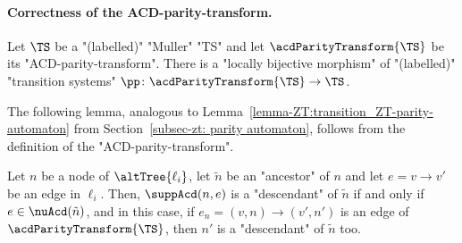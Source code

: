 \documentclass[10pt,a4paper]{amsart}
\newcommand{\re}[1]{\xrightarrow{#1}}
\begin{document}
\paragraph*{Correctness of the ACD-parity-transform.}

\begin{proposition}\label{prop-ACD:correctness_ACD-parity_transform}
	Let $\TS$ be a "(labelled)" "Muller" "TS" and let $\acdParityTransform{\TS}$ be its "ACD-parity-transform". There is a "locally bijective morphism" of "(labelled)" "transition systems" $\pp\colon \acdParityTransform{\TS} \to \TS$.
\end{proposition}

The following lemma, analogous to Lemma~\ref{lemma-ZT:transition_ZT-parity-automaton} from Section~\ref{subsec-zt: parity automaton}, follows from the definition of the "ACD-parity-transform".
\begin{lemma}\label{lemma-acd:transition_ACD-parity_transform}
	Let $n$ be a node of $\altTree{\ell_i}$, let $\tilde{n}$ be an "ancestor" of $n$ and let $e= v\re{}v'$ be an edge in $\ell_i$. Then, $\suppAcd(n, e)$ is a "descendant" of $\tilde{n}$ if and only if $e\in \nuAcd(\tilde{n})$, and in this case, if $e_n = (v,n)\re{} (v',n')$ is an edge of $\acdParityTransform{\TS}$, then $n'$ is a "descendant" of  $\tilde{n}$ too.
\end{lemma}
\end{document}
